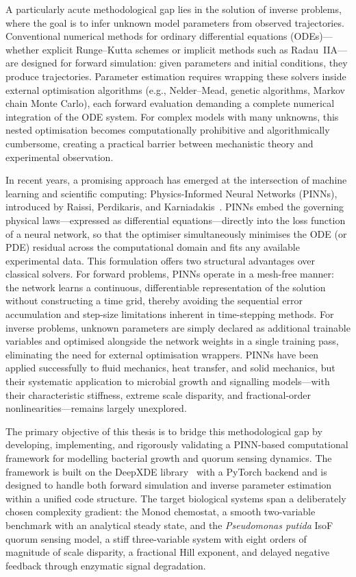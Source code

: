 \documentclass[14pt,a4paper,openany]{extbook}
\begin{document}
A particularly acute methodological gap lies in the solution of inverse problems, where the goal is to infer unknown model parameters from observed trajectories. Conventional numerical methods for ordinary differential equations (ODEs)---whether explicit Runge--Kutta schemes or implicit methods such as Radau~IIA---are designed for forward simulation: given parameters and initial conditions, they produce trajectories. Parameter estimation requires wrapping these solvers inside external optimisation algorithms (e.g., Nelder--Mead, genetic algorithms, Markov chain Monte Carlo), each forward evaluation demanding a complete numerical integration of the ODE system. For complex models with many unknowns, this nested optimisation becomes computationally prohibitive and algorithmically cumbersome, creating a practical barrier between mechanistic theory and experimental observation.

In recent years, a promising approach has emerged at the intersection of machine learning and scientific computing: Physics-Informed Neural Networks (PINNs), introduced by Raissi, Perdikaris, and Karniadakis~\cite{raissi2019}. PINNs embed the governing physical laws---expressed as differential equations---directly into the loss function of a neural network, so that the optimiser simultaneously minimises the ODE (or PDE) residual across the computational domain and fits any available experimental data. This formulation offers two structural advantages over classical solvers. For forward problems, PINNs operate in a mesh-free manner: the network learns a continuous, differentiable representation of the solution without constructing a time grid, thereby avoiding the sequential error accumulation and step-size limitations inherent in time-stepping methods. For inverse problems, unknown parameters are simply declared as additional trainable variables and optimised alongside the network weights in a single training pass, eliminating the need for external optimisation wrappers. PINNs have been applied successfully to fluid mechanics, heat transfer, and solid mechanics, but their systematic application to microbial growth and signalling models---with their characteristic stiffness, extreme scale disparity, and fractional-order nonlinearities---remains largely unexplored.

The primary objective of this thesis is to bridge this methodological gap by developing, implementing, and rigorously validating a PINN-based computational framework for modelling bacterial growth and quorum sensing dynamics. The framework is built on the DeepXDE library~\cite{lu2021deepxde} with a PyTorch backend and is designed to handle both forward simulation and inverse parameter estimation within a unified code structure. The target biological systems span a deliberately chosen complexity gradient: the Monod chemostat, a smooth two-variable benchmark with an analytical steady state, and the \textit{Pseudomonas putida} IsoF quorum sensing model, a stiff three-variable system with eight orders of magnitude of scale disparity, a fractional Hill exponent, and delayed negative feedback through enzymatic signal degradation.
\end{document}
